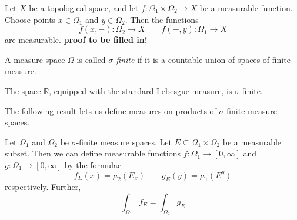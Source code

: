 \begin{corollary} \label{mpf}
Let $X$ be a topological space, and let $f\colon \Omega_1 \times \Omega_2 \rightarrow X$ be a measurable function.  Choose points $x\in \Omega_1$ and $y\in \Omega_2$.  Then the functions
$$f(x,-) \colon \Omega_2 \rightarrow X \qquad f(-,y) \colon \Omega_1 \rightarrow X$$
are measurable.
\textbf{proof to be filled in!}
\end{corollary}

\begin{definition}
A measure space $\Omega$ is called {\em $\sigma$-finite} if it is a countable union of spaces of finite measure.
\end{definition}

\begin{example}
The space $\mathbb R$, equipped with the standard Lebesgue measure, is $\sigma$-finite.
\end{example}

The following result lets us define measures on products of $\sigma$-finite measure spaces.

\begin{theorem} \label{pre-fub}
Let $\Omega_1$ and $\Omega_2$ be $\sigma$-finite measure spaces.  Let $E\subseteq \Omega_1\times \Omega_2$ be a measurable subset.  Then we can define measurable functions $f\colon \Omega_1\rightarrow [0,\infty]$ and $g\colon \Omega_1\rightarrow [0,\infty]$ by the formulae
$$f_E(x) = \mu_2 (E_x) \qquad g_E(y) = \mu_1 (E^y)$$
respectively.  Further,
$$\int_{\Omega_1} f_E = \int_{\Omega_2} g_E$$
\end{theorem}

